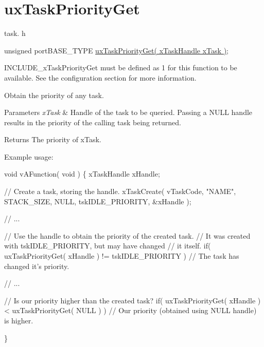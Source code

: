 \hypertarget{group__uxTaskPriorityGet}{}\section{ux\+Task\+Priority\+Get}
\label{group__uxTaskPriorityGet}
task. h 
\begin{DoxyPre}unsigned portBASE\_TYPE \hyperlink{task_8h_a764e3d93e7e20aa4f3926314fba11329}{uxTaskPriorityGet( xTaskHandle xTask )};\end{DoxyPre}


I\+N\+C\+L\+U\+D\+E\+\_\+x\+Task\+Priority\+Get must be defined as 1 for this function to be available. See the configuration section for more information.

Obtain the priority of any task.


\begin{DoxyParams}{Parameters}
{\em x\+Task} & Handle of the task to be queried. Passing a N\+U\+LL handle results in the priority of the calling task being returned.\\
\hline
\end{DoxyParams}
\begin{DoxyReturn}{Returns}
The priority of x\+Task.
\end{DoxyReturn}
Example usage\+: 
\begin{DoxyPre}
void vAFunction( void )
\{
xTaskHandle xHandle;
\begin{DoxyVerb}// Create a task, storing the handle.
xTaskCreate( vTaskCode, "NAME", STACK_SIZE, NULL, tskIDLE_PRIORITY, &xHandle );

// ...

// Use the handle to obtain the priority of the created task.
// It was created with tskIDLE_PRIORITY, but may have changed
// it itself.
if( uxTaskPriorityGet( xHandle ) != tskIDLE_PRIORITY )
{
 // The task has changed it's priority.
}

// ...

// Is our priority higher than the created task?
if( uxTaskPriorityGet( xHandle ) < uxTaskPriorityGet( NULL ) )
{
 // Our priority (obtained using NULL handle) is higher.
}
\end{DoxyVerb}

\}
  \end{DoxyPre}
 